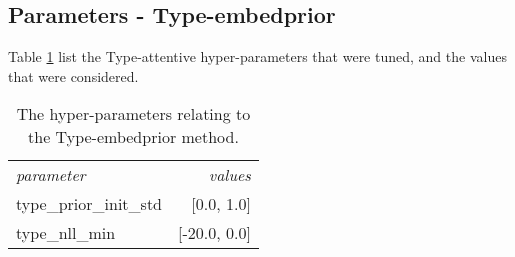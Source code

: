 \subsection{Parameters - Type-embedprior}
Table \ref{tab:hyperparams-embedprior} list the Type-attentive hyper-parameters that were tuned, and the values that were considered.
\begin{table}[h!]
    \centering
    \begin{tabular}{lr}
        \toprule
        \textit{parameter}          & \textit{values}   \\
        \cmidrule{1-2}
        type\_prior\_init\_std         & [0.0, 1.0]     \\
        type\_nll\_min              & [-20.0, 0.0]      \\
        \bottomrule
    \end{tabular}
    \label{tab:hyperparams-embedprior}
    \caption[The hyper-parameters relating to the Type-embedprior method.]{The hyper-parameters relating to the Type-embedprior method.}
\end{table}



\newpage
